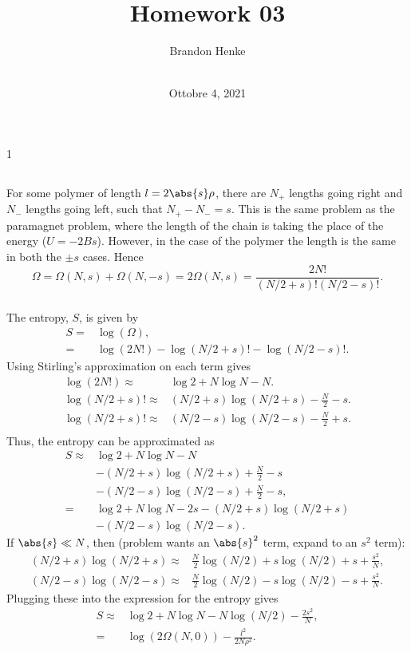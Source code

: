 \documentclass[a4paper,12pt,twoside]{article}
\title{Homework 03}
\author{
	Brandon Henke\\
	\course\\
	\professor
}
\date{Ottobre 4, 2021}
\newcommand{\mcols}{0}
\begin{document}

\maketitle
\if\mcols1
\begin{multicols*}{2}
\fi
\setcounter{section}{3}
\subsection{}
\subsubsection{}
For some polymer of length $l = 2\abs{s}\rho$, there are $N_+$ lengths going right and $N_-$ lengths going left, such that $N_+ - N_- = s$.
This is the same problem as the paramagnet problem, where the length of the chain is taking the place of the energy ($U=-2Bs$).
However, in the case of the polymer the length is the same in both the $\pm s$ cases.
Hence
\begin{equation}
	\Omega = \Omega(N,s)+\Omega(N,-s) = 2\Omega(N,s) = \frac{2N!}{(N/2+s)!(N/2-s)!}.
\end{equation}
\subsubsection{}
The entropy, $S$, is given by
\begin{align}
	S =& \log(\Omega),\\
	=& \log(2N!) - \log(N/2+s)! - \log(N/2-s)!.
\end{align}
Using Stirling's approximation on each term gives
\begin{align}
	\log(2N!) \approx& \log{2} + N\log{N} - N.\\
	\log(N/2+s)! \approx& (N/2+s)\log(N/2+s) - \frac{N}{2}-s.\\
	\log(N/2+s)! \approx& (N/2-s)\log(N/2-s) - \frac{N}{2}+s.\\
\end{align}
Thus, the entropy can be approximated as
\begin{align}
	S \approx& \log{2} + N\log{N} - N\nonumber\\
	&- (N/2+s)\log(N/2+s) + \frac{N}{2}-s\nonumber\\
	&- (N/2-s)\log(N/2-s) + \frac{N}{2}-s,\\
	=& \log{2} + N\log{N} - 2s - (N/2+s)\log(N/2+s)\nonumber\\
	&- (N/2-s)\log(N/2-s).
\end{align}
If $\abs{s} \ll N$, then (problem wants an $\abs{s}^2$ term, expand to an $s^2$ term):
\begin{align}
	(N/2+s)\log(N/2+s) \approx& \frac{N}{2}\log(N/2)+s\log(N/2)+s+\frac{s^2}{N},\\
	(N/2-s)\log(N/2-s) \approx& \frac{N}{2}\log(N/2)-s\log(N/2)-s+\frac{s^2}{N}.
\end{align}
Plugging these into the expression for the entropy gives
\begin{align}
	S \approx& \log{2} + N\log{N} - N\log(N/2) - \frac{2s^2}{N},\\
	=& \log(2\Omega(N,0)) - \frac{l^2}{2N\rho^2}.
\end{align}


\end{multicols*}
\end{document}
